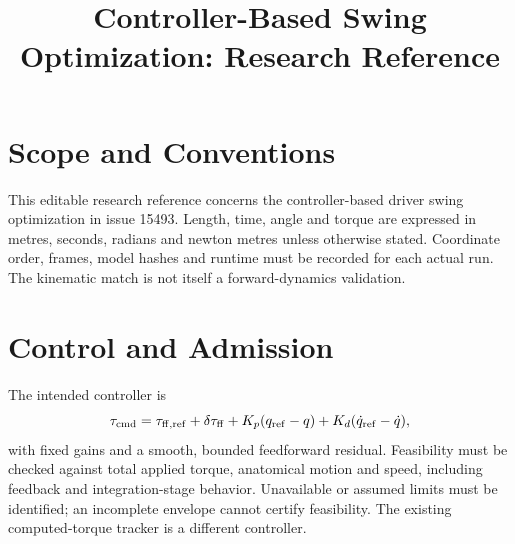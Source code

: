 \documentclass{article}
\title{Controller-Based Swing Optimization: Research Reference}
\begin{document}
\maketitle
\section{Scope and Conventions}
This editable research reference concerns the controller-based driver swing
optimization in issue 15493. Length, time, angle and torque are expressed in
metres, seconds, radians and newton metres unless otherwise stated. Coordinate
order, frames, model hashes and runtime must be recorded for each actual run.
The kinematic match is not itself a forward-dynamics validation.

\section{Control and Admission}
The intended controller is
\[
 \tau_{\rm cmd}=\tau_{\rm ff,ref}+\delta\tau_{\rm ff}
 +K_p(q_{\rm ref}-q)+K_d(\dot q_{\rm ref}-\dot q),
\]
with fixed gains and a smooth, bounded feedforward residual. Feasibility
must be checked against total applied torque, anatomical motion and speed,
including feedback and integration-stage behavior. Unavailable or assumed
limits must be identified; an incomplete envelope cannot certify feasibility.
The existing computed-torque tracker is a different controller.
\end{document}
